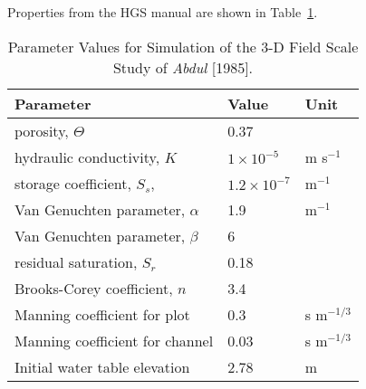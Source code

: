\label{texfile:3D_Example_Abdul}

Properties from the HGS manual are shown in Table~\ref{tab:abdul}.
    \begin{table}
        \centering
        \caption{Parameter Values for Simulation of the 3-D Field Scale Study of {\em Abdul} [1985].}
        \begin{tabular}{lll}  \hline
            Parameter                                       & Value & Unit \\ \hline
            porosity, $\Theta$                              &  0.37                    & \\
            hydraulic conductivity, $K$                     &  $ 1 \times 10^{-5}$      &m s$^{-1}$ \\
            storage coefficient, $S_s$,                     &  $ 1.2 \times 10^{-7}$    & m$^{-1}$\\
            Van Genuchten parameter, $\alpha$               &  1.9                     &m$^{-1}$ \\
            Van Genuchten parameter, $\beta$                &  6                       & \\
            residual saturation, $S_r$                      &  0.18                    & \\
            Brooks-Corey coefficient, $n$                   &  3.4                     & \\
            Manning coefficient for plot                   &  0.3                     &s m$^{-1/3}$ \\
            Manning coefficient for channel                &  0.03                    &s m$^{-1/3}$ \\
            Initial water table elevation                   &  2.78                    &m \\
        \hline
        \end{tabular}
        \label{tab:abdul}
    \end{table}

